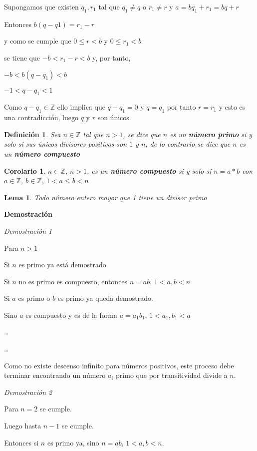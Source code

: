 \documentclass[a4paper,1pt]{report}
\newtheorem*{cor}{Corolario}
\newtheorem*{dfn}{Definición}
\newtheorem*{lem}{Lema}
\begin{document}
Supongamos que existen $q_1,r_1$ tal que $q_1\neq q$ o $r_1\neq r$ y $a=bq_1+r_1=bq+r$

Entonces $b(q-q1)=r_1-r$

y como se cumple que $0\leq r < b$ y $0\leq r_1 < b$

se tiene que $-b<r_1-r<b$ y, por tanto,

$-b<b(q-q_1)<b$

$-1<q-q_1<1$

Como $q-q_1\in\mathbb{Z}$ ello implica que $q-q_1=0$ y $q=q_1$ por tanto $r = r_1$ y esto es una contradicción, luego $q$ y $r$ son únicos.



\begin{dfn}
 Sea $n\in\mathbb{Z}$ tal que $n>1$, se dice que $n$ es un \textbf{número primo} si y solo si sus únicos divisores positivos son $1$ y $n$, de lo contrario se dice que $n$ es un \textbf{número compuesto}
\end{dfn}

\begin{cor}
$n\in\mathbb{Z}$, $n>1$, es un \textbf{número compuesto} si y solo si $n=a*b$ con $a\in\mathbb{Z}$, $b\in\mathbb{Z}$, $1<a\leq b < n$
\end{cor}

\begin{lem}
 Todo número entero mayor que 1 tiene un divisor primo
\end{lem}

\textbf{Demostración}

\textit{Demostración 1}

Para $n>1$

Si $n$ es primo ya está demostrado.

Si $n$ no es primo es compuesto, entonces $n=ab$, $1<a,b<n$

Si $a$ es primo o $b$ es primo ya queda demostrado.

Sino $a$ es compuesto y es de la forma $a=a_1b_1$, $1<a_1,b_1<a$

\dots

\dots

Como no existe descenso infinito para números positivos, este proceso debe terminar encontrando un número $a_i$ primo que por transitividad divide a $n$.

\textit{Demostración 2}

Para $n=2$ se cumple.

Luego hasta $n-1$ se cumple. 

Entonces si $n$ es primo ya, sino $n=ab$, $1<a,b<n$.
\end{document}
